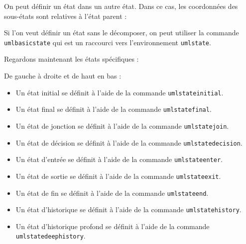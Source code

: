 \documentclass[a4paper,11pt]{report}
\newcommand{\inputTikZ}[1]{%
  }%
\newcommand{\inputTikZ}[1]{%
    \texttt{[image: fig/\#1.pdf]}%
  }%
\begin{document}
On peut définir un état dans un autre état. Dans ce cas, les coordonnées des sous-états sont relatives à l'état parent :

\medskip

\begin{minipage}{0.51\textwidth}

\end{minipage}
\begin{minipage}{0.49\textwidth}
\begin{center}
\inputTikZ{stateinner}
\end{center}
\end{minipage}

\medskip

Si l'on veut définir un état sans le décomposer, on peut utiliser la commande {\tt umlbasicstate} qui est un raccourci vers l'environnement {\tt umlstate}.

\medskip

Regardons maintenant les états spécifiques :

\medskip

\begin{minipage}{0.51\textwidth}

\end{minipage}
\begin{minipage}{0.49\textwidth}
\begin{center}
\inputTikZ{statespecial}
\end{center}
\end{minipage}

\medskip

De gauche à droite et de haut en bas :

\medskip

\begin{itemize}
\item Un état initial se définit à l'aide de la commande {\tt umlstateinitial}.
\item Un état final se définit à l'aide de la commande {\tt umlstatefinal}.
\item Un état de jonction se définit à l'aide de la commande {\tt umlstatejoin}.
\item Un état de décision se définit à l'aide de la commande {\tt umlstatedecision}.
\item Un état d'entrée se définit à l'aide de la commande {\tt umlstateenter}.
\item Un état de sortie se définit à l'aide de la commande {\tt umlstateexit}.
\item Un état de fin se définit à l'aide de la commande {\tt umlstateend}.
\item Un état d'historique se définit à l'aide de la commande {\tt umlstatehistory}.
\item Un état d'historique profond se définit à l'aide de la commande {\tt umlstatedeephistory}.
\end{itemize}
\end{document}
